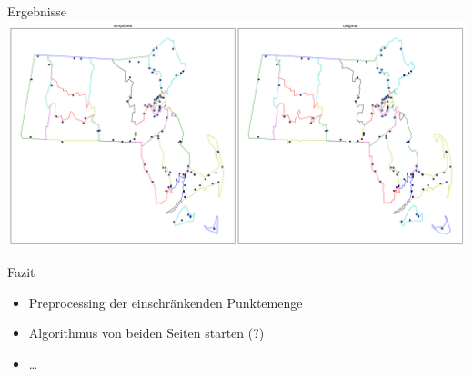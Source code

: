 \documentclass[14pt]{beamer}
\begin{document}
\begin{frame}{Ergebnisse}
\includegraphics[width=1.25\textwidth,center]{img/result_dataset2.pdf}
\end{frame}


\begin{frame}{Fazit}
  \begin{itemize}
	\item Preprocessing der einschränkenden Punktemenge
	\item Algorithmus von beiden Seiten starten (?)
	\item \dots
\end{itemize}
\end{frame}
\end{document}
